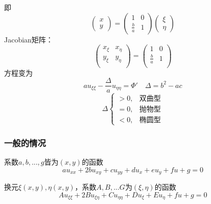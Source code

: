 即
$$\left(\begin{matrix}x\\y\end{matrix}\right)=\left(\begin{matrix}1&0\\\frac{b}{a}&1\end{matrix}\right)\left(\begin{matrix}\xi\\\eta\end{matrix}\right)
$$
Jacobian矩阵：
$$
\left(\begin{matrix}{x_{\xi}}&{x_{\eta}}\\{y_{\xi}}&{y_{\eta}}\\\end{matrix}\right)=\left(\begin{matrix}{1}&{0}\\{\frac{b}{a}}&{1}\\\end{matrix}\right)
$$
方程变为
$$au_{\xi\xi}-\frac{\Delta}{a}u_{\eta\eta}=\Phi'\quad \Delta=b^2-ac$$
$$\Delta\begin{cases}
    >0,&\text{双曲型}\\
    =0,&\text{抛物型}\\
    <0,&\text{椭圆型}
    \end{cases}$$

\subsubsection{一般的情况}
系数$a,b,...,g$皆为$(x,y)$的函数
$$au_{xx}+2bu_{xy}+cu_{yy}+du_x+eu_y+fu+g=0$$

换元$\xi(x,y),\eta(x,y)$，系数$A,B,...G$为$(\xi,\eta)$的函数
$$Au_{\xi\xi}+2Bu_{\xi\eta}+Cu_{\eta\eta}+Du_\xi+Eu_\eta+fu+g=0$$

